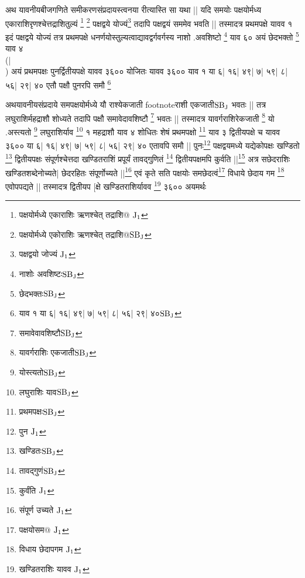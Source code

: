 \documentclass[12pt]{article}
\begin{document}
{अथ यावनीयबीजगणिते समीकरणसंप्रदायस्त्वनया रीत्यास्ति
सा यथा ||
यदि समयोः पक्षयोर्मध्य एकाराशिरृण\-श्चेत्तद्राशितुल्यं
\footnote{{\s पक्षयोर्मध्ये एकाराशिः ऋणश्चेत् तद्राशि@ }${\rm J_1}$} \footnote{{\s पक्षयोर्मध्ये एकोराशिः ऋणश्चेत् तद्राशि@}${\rm SB_J}$}
पक्षद्वये योज्यं\footnote{{\s पक्षद्वयो जोज्यं }${\rm J_1}$}
तदापि पक्षद्वयं सममेव भवति ||
तस्मादत्र प्रथमपक्षे यावव %
१ 
इदं पक्षद्वये योज्यं तत्र प्रथमपक्षे
धनर्णयोस्तुल्यत्वाद्यावद्वर्गवर्गस्य नाशो .अवशिष्टो \footnote{{\s नाशोः अवशिष्टः}${\rm SB_J}$}
याव ६०
अयं छेदभक्तो \footnote{{\s छेदभक्तः}${\rm SB_J}$} याव ४\\(|\\) अयं प्रथमपक्षः पुनर्द्वितीयपक्षे
यावव ३६०० योजितः यावव ३६००
याव १ या ६| १६| ४९| ७| ५९| ८| ५६| २९| ४०
एतौ पक्षौ पुनरपि समौ
 \footnote{{\s याव १ या ६| १६| ४९| ७| ५९| ८| ५६| २९| ४०}${\rm SB_J}$}%

अथयावनीयसंप्रदाये समपक्षयोर्मध्ये यौ
राश्येकजाती footnote{{\s राशी एकजाती}${\rm SB_J}$} भवतः ||
तत्र लघुराशिर्महद्राशौ शोध्यते तदापि पक्षौ समावेदावशिष्टौ \footnote{{\s समावेवावशिष्टौ}${\rm SB_J}$}
भवतः ||
तस्मादत्र यावर्गराशिरेकजाती \footnote{{\s यावर्गराशिः एकजाती}${\rm SB_J}$} यो .अस्त्यतो \footnote{{\s योस्त्यतो}${\rm SB_J}$} लघुराशिर्याव \footnote{{\s लघुराशिः याव}${\rm SB_J}$} १
महद्राशौ याव ४ शोधितः शेषं प्रथमपक्षो \footnote{{\s प्रथमपक्षः}${\rm SB_J}$} याव ३
द्वितीयपक्षे च यावव ३६००
या ६| १६| ४९| ७| ५९| ८| ५६| २९| ४०
एतावपि समौ ||
पुनः\footnote{{\s पुन } ${\rm J_1}$}
पक्षद्वयमध्ये यद्येकोपक्षः खण्डितो \footnote{{\s खण्डितः}${\rm SB_J}$} द्वितीयपक्षः
संपूर्णश्चेत्तदा खण्डितराशिं प्रपूर्यं
तावद्गुणितं \footnote{{\s तावद्गुणं}${\rm SB_J}$} द्वितीयपक्षमपि
कुर्वति ||\footnote{{\s कुर्वंति }${\rm J_1}$}
अत्र सछेदराशिः खण्डितशब्देनोच्यते|
छेदरहितः संपूर्णोच्यते ||\footnote{{\s संपूर्ण उच्यते }${\rm J_1}$}
एवं कृते सति पक्षयोः समछेदत्वं\footnote{{\s पक्षयोसम@ }${\rm J_1}$}
विधाये छेदाय गम \footnote{{\s विधाय छेदापगम }${\rm J_1}$}
 एवोपपद्यते ||
तस्मादत्र द्वितीयप [क्षे 
खण्डितराशिर्यावव \footnote{{\s खण्डितराशिः यावव }${\rm J_1}$} ३६००
अयमर्थः %

}
\end{document}
